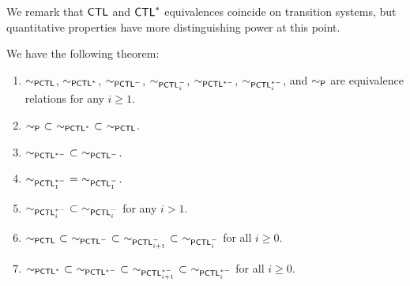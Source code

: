 \documentclass{LMCS}
\newcommand{\BSP}{\ensuremath{\sim_{{\sf P}}}}
\newcommand{\PCTL}{{\sf PCTL}}
\newcommand{\CTL}{{\sf CTL}}
\newcommand{\EPCTL}{\sim_{\PCTL}}
\newcommand{\EPCTLM}{\sim_{\PCTL^{-}}}
\newcommand{\iEPCTLM}[1]{\sim_{\PCTL^{-}_{#1}}}
\newcommand{\EPCTLS}{\sim_{\PCTL^{*}}}
\newcommand{\EPCTLSM}{\sim_{\PCTL^{*-}}}
\newcommand{\iEPCTLSM}[1]{\sim_{\PCTL_{#1}^{*-}}}
\begin{document}
We remark that $\CTL$ and $\CTL^{*}$ equivalences coincide on transition systems, but quantitative properties have more distinguishing power at this point.

We have the following theorem:
\begin{thm}\label{thm:PCLT and Probabilistic bisimulation}\hfill
\begin{enumerate}[\em(1)]
\item $\EPCTL$, $\EPCTLS$, $\EPCTLM$, $\iEPCTLM{i}$, $\EPCTLSM$, $\iEPCTLSM{i}$, and $\BSP$ are equivalence relations for any $i\geq 1$.
\item $\BSP~\subset~\EPCTLS~\subset~\EPCTL$.
\item $\EPCTLSM~\subset~\EPCTLM$.
\item $\iEPCTLSM{1}~=~\iEPCTLM{1}$.
\item $\iEPCTLSM{i}~\subset~\iEPCTLM{i}$ for any $i>1$.
\item $\EPCTL~\subset~\EPCTLM~\subset~\iEPCTLM{i+1}~\subset~\iEPCTLM{i}$ for all $i\geq 0$.
\item $\EPCTLS~\subset~\EPCTLSM~\subset~\iEPCTLSM{i+1}~\subset~\iEPCTLSM{i}$ for all $i\geq 0$.
\end{enumerate}
\end{thm}
\end{document}
